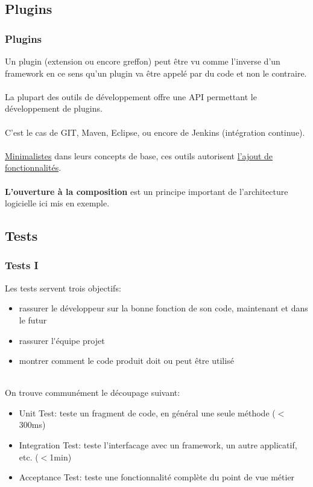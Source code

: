 \subsection{Plugins}
\begin{frame}
	\frametitle{Plugins}
    Un plugin (extension ou encore greffon) peut \^{e}tre vu comme l'inverse d'un framework en ce sens qu'un plugin va \^{e}tre appel\'{e} par du code et non le contraire.
    \\~\\
    La plupart des outils de d\'{e}veloppement offre une API permettant le d\'{e}veloppement de plugins.
    \\~\\
    C'est le cas de GIT, Maven, Eclipse, ou encore de Jenkins (int\'{e}gration continue).
    \\~\\
    \underline{Minimalistes} dans leurs concepts de base, ces outils autorisent \underline{l'ajout de} \underline{fonctionnalit\'{e}s}.
    \\~\\
    \textbf{L'ouverture \`{a} la composition} est un principe important de l'architecture logicielle ici mis en exemple.
\end{frame}

\subsection{Tests}
\begin{frame}
	\frametitle{Tests I}
    Les tests servent trois objectifs:
\begin{itemize}
    \item rassurer le d\'{e}veloppeur sur la bonne fonction de son code, maintenant et dans le futur
    \item rassurer l\'{}\'{e}quipe projet
    \item montrer comment le code produit doit ou peut \^{e}tre utilis\'{e}
\end{itemize}
~\\
On trouve commun\'{e}ment le d\'{e}coupage suivant:
\begin{itemize}
    \item Unit Test: teste un fragment de code, en g\'{e}n\'{e}ral une seule m\'{e}thode ($<$300ms)
    \item Integration Test: teste l'interfacage avec un framework, un autre applicatif, etc. ($<$1min)
    \item Acceptance Test: teste une fonctionnalit\'{e} compl\`{e}te du point de vue m\'{e}tier
\end{itemize}
\end{frame}

